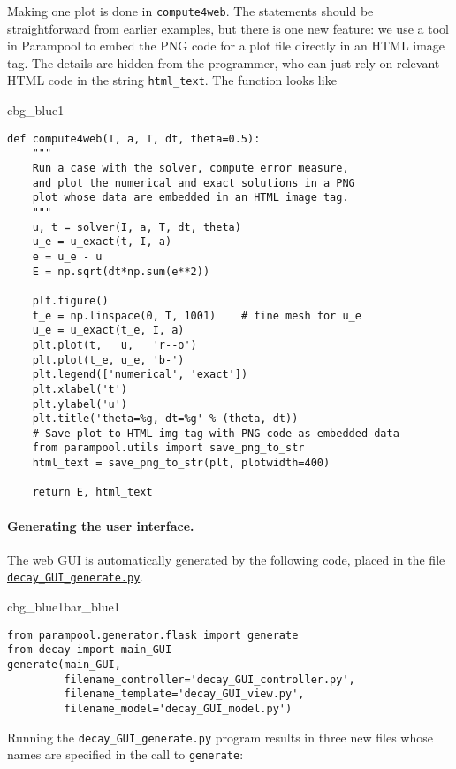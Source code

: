 \documentclass[graybox,sectrefs,envcountresetchap,open=right,final]{svmonodo}
\newenvironment{_cod_tight}[1]{
   \def\FrameCommand{\colorbox{#1}}
   \FrameRule0.6pt\MakeFramed {\FrameRestore}\vskip3mm}
   {\vskip0mm\endMakeFramed}
\newenvironment{cod}[1]{
\bgroup\rmfamily
\fboxsep=0mm\relax
\begin{_cod_tight}{#1}
\list{}{\parsep=-2mm\parskip=0mm\topsep=0pt\leftmargin=2mm
\rightmargin=2\leftmargin\leftmargin=4pt\relax}
\item\relax}
{\endlist\end{_cod_tight}\egroup}
\newenvironment{_pro_tight}[2]{
   \def\FrameCommand{\color{#2}\vrule width 1mm\normalcolor\colorbox{#1}}
   \FrameRule0.6pt\MakeFramed {\advance\hsize-2mm\FrameRestore}\vskip3mm}
   {\vskip0mm\endMakeFramed}
\newenvironment{pro}[2]{
\bgroup\rmfamily
\fboxsep=0mm\relax
\begin{_pro_tight}{#1}{#2}
\list{}{\parsep=-2mm\parskip=0mm\topsep=0pt\leftmargin=2mm
\rightmargin=2\leftmargin\leftmargin=4pt\relax}
\item\relax}
{\endlist\end{_pro_tight}\egroup}
\begin{document}
Making one plot is done in \texttt{compute4web}. The statements should be
straightforward from earlier examples, but there is one new feature:
we use a tool in Parampool to embed the PNG code for a plot file
directly in an HTML image tag. The details are hidden from the
programmer, who can just rely on
relevant HTML code in the string \Verb!html_text!. The function looks like

\begin{cod}{cbg_blue1}\begin{Verbatim}[numbers=none,fontsize=\fontsize{9pt}{9pt},baselinestretch=0.95,xleftmargin=2mm]
def compute4web(I, a, T, dt, theta=0.5):
    """
    Run a case with the solver, compute error measure,
    and plot the numerical and exact solutions in a PNG
    plot whose data are embedded in an HTML image tag.
    """
    u, t = solver(I, a, T, dt, theta)
    u_e = u_exact(t, I, a)
    e = u_e - u
    E = np.sqrt(dt*np.sum(e**2))

    plt.figure()
    t_e = np.linspace(0, T, 1001)    # fine mesh for u_e
    u_e = u_exact(t_e, I, a)
    plt.plot(t,   u,   'r--o')
    plt.plot(t_e, u_e, 'b-')
    plt.legend(['numerical', 'exact'])
    plt.xlabel('t')
    plt.ylabel('u')
    plt.title('theta=%g, dt=%g' % (theta, dt))
    # Save plot to HTML img tag with PNG code as embedded data
    from parampool.utils import save_png_to_str
    html_text = save_png_to_str(plt, plotwidth=400)

    return E, html_text
\end{Verbatim}
\end{cod}
\noindent


\paragraph{Generating the user interface.}
The web GUI is automatically generated by
the following code, placed in the file \href{{http://tinyurl.com/ofkw6kc/softeng/decay_GUI_generate.py}}{\nolinkurl{decay_GUI_generate.py}}.

\begin{pro}{cbg_blue1}{bar_blue1}\begin{Verbatim}[numbers=none,fontsize=\fontsize{9pt}{9pt},baselinestretch=0.95,xleftmargin=2mm]
from parampool.generator.flask import generate
from decay import main_GUI
generate(main_GUI,
         filename_controller='decay_GUI_controller.py',
         filename_template='decay_GUI_view.py',
         filename_model='decay_GUI_model.py')
\end{Verbatim}
\end{pro}
\noindent
Running the \Verb!decay_GUI_generate.py! program results in three new
files whose names are specified in the call to \texttt{generate}:
\end{document}
